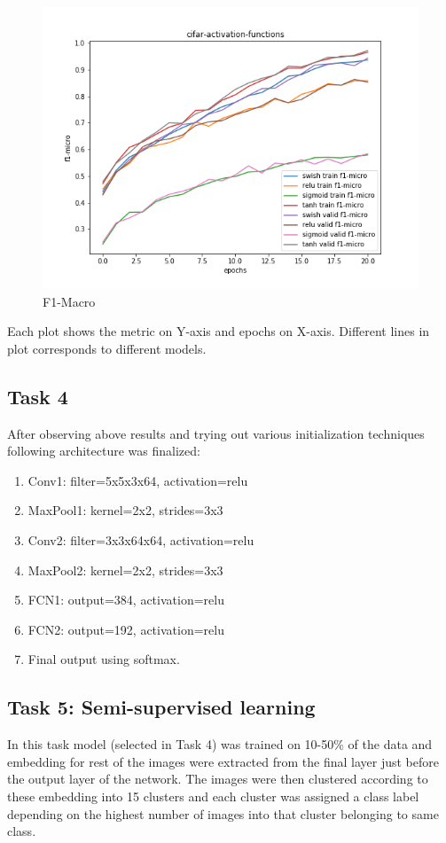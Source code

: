 \documentclass{article}
\begin{document}
\begin{figure}[!htb]
	\includegraphics[width=\linewidth]{../output_plots/CIFAR/task-3/cifar-activation-functions-F1-Micro-score-f1-micro.png}
	\caption{F1-Macro}\label{fig:part_2_task_3_f1-macro}
	\endminipage
\end{figure}

Each plot shows the metric on Y-axis and epochs on X-axis. Different lines in plot corresponds to different models.

\pagebreak
\subsection{Task 4}
After observing above results and trying out various initialization techniques following architecture was finalized:
\begin{enumerate}
	\item Conv1: filter=5x5x3x64, activation=relu
	\item MaxPool1: kernel=2x2, strides=3x3
	\item Conv2: filter=3x3x64x64, activation=relu
	\item MaxPool2: kernel=2x2, strides=3x3
	\item FCN1: output=384, activation=relu
	\item FCN2: output=192, activation=relu
	\item Final output using softmax.
\end{enumerate}

\subsection{Task 5: Semi-supervised learning}
In this task model (selected in Task 4) was trained on 10-50\% of the data and embedding for rest of the images were extracted from the final layer just before the output layer of the network. The images were then clustered according to these embedding into 15 clusters and each cluster was assigned a class label depending on the highest number of images into that cluster belonging to same class.
\end{document}
